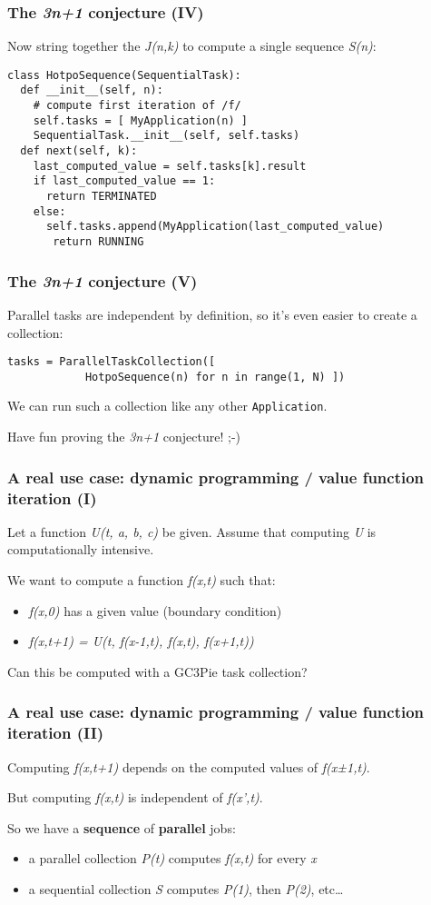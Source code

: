 \documentclass[presentation]{beamer}
\begin{document}
\begin{frame}[fragile]
\frametitle{The \emph{3n+1} conjecture (IV)}
\label{sec-30}

  Now string together the \emph{J(n,k)} to compute a single sequence
  \emph{S(n)}:
\begin{verbatim}
class HotpoSequence(SequentialTask):
  def __init__(self, n):
    # compute first iteration of /f/
    self.tasks = [ MyApplication(n) ]
    SequentialTask.__init__(self, self.tasks)
  def next(self, k):
    last_computed_value = self.tasks[k].result
    if last_computed_value == 1:
      return TERMINATED
    else:
      self.tasks.append(MyApplication(last_computed_value)
       return RUNNING
\end{verbatim}
\end{frame}
\begin{frame}[fragile]
\frametitle{The \emph{3n+1} conjecture (V)}
\label{sec-31}

  Parallel tasks are independent by definition, so it's even easier to
  create a collection:
\begin{verbatim}
tasks = ParallelTaskCollection([ 
            HotpoSequence(n) for n in range(1, N) ])
\end{verbatim}
  
  We can run such a collection like any other \texttt{Application}.

  Have fun proving the \emph{3n+1} conjecture! ;-)
\end{frame}
\begin{frame}
\frametitle{A real use case: dynamic programming / value function iteration (I)}
\label{sec-32}

  Let a function \emph{U(t, a, b, c)} be given.  Assume that computing
  \emph{U} is computationally intensive.

  We want to compute a function \emph{f(x,t)} such that:
\begin{itemize}
\item \emph{f(x,0)} has a given value (boundary condition)
\item \emph{f(x,t+1) = U(t, f(x-1,t), f(x,t), f(x+1,t))}
\end{itemize}

  Can this be computed with a GC3Pie task collection?
\end{frame}
\begin{frame}
\frametitle{A real use case: dynamic programming / value function iteration (II)}
\label{sec-33}

  Computing \emph{f(x,t+1)} depends on the computed values of \emph{f(x±1,t)}.

  But computing \emph{f(x,t)} is independent of \emph{f(x',t)}.

  So we have a \textbf{sequence} of \textbf{parallel} jobs:
\begin{itemize}
\item a parallel collection \emph{P(t)} computes \emph{f(x,t)} for every \emph{x}
\item a sequential collection \emph{S} computes \emph{P(1)}, then \emph{P(2)}, etc\ldots{}
\end{itemize}
\end{frame}
\end{document}
